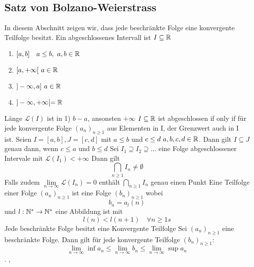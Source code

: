 \subsection{Satz von Bolzano-Weierstrass}
In diesem Abschnitt zeigen wir, dass jede beschränkte Folge eine konvergente Teilfolge besitzt.
\Def[2.21] Ein abgeschlossenes Intervall ist \(I \subseteq \mathbb{R}\)
\begin{enumerate}
    \item [1] \([a,b] \quad a \leq b,\  a,b \in \mathbb{R}\)
    \item [2] \([a,+\infty[$ $a \in \R\)
    \item [3] \(]-\infty,a]$ $a \in \R\)
    \item [4] \(]-\infty,+\infty[ = \mathbb{R}\)
\end{enumerate}
Länge \(\mathcal{L}(I)\) ist in 1) $b-a$, ansonsten $+\infty$ \newline
\Bem[2.22] $I \subseteq \mathbb{R}$ ist abgeschlossen if only if für jede konvergente Folge \((a_n)_{n \geq 1}\) aus Elementen in I, der Grenzwert auch in I ist. \newline
\Bem[2.23] Seien \( I = [a,b], J = [c,d]\) mit \(a \leq b \) und \(c \leq d \ a,b,c,d \in \mathbb{R}\). Dann gilt \( I \subseteq J \) genau dann, wenn \(c \leq a \) und \(b \leq d\) \newline \newline \newline
{} Sei \(I_1 \supseteq I_2 \supseteq \dots\) eine Folge abgeschlossener Intervale mit \(\mathcal{L}(I_1) < +\infty\)
Dann gilt \[ {\bigcap}_{n\geq1} I_{n} \neq \emptyset \] Falls zudem \(\lim\limits_{n \rightarrow \infty} \mathcal{L}(I_n) = 0\) enthält \({\bigcap}_{n\geq1} I_{n}\) genau einen Punkt \newline
\Def[2.27] Eine Teilfolge einer Folge \((a_n)_{n \geq 1}\) ist eine Folge \((b_n)_{n \geq 1}\) wobei \[b_n = a_l(n)\] und \(l: \mathbb{N}^* \rightarrow \mathbb{N}^*\) eine Abbildung ist mit \[l(n) < l(n+1) \quad \forall n \geq 1s\] 
 Jede beschränkte Folge besitzt eine Konvergente Teilfolge \newline
\Bem[2.30] Sei \((a_n)_{n \geq 1}\) eine beschränkte Folge. Dann gilt für jede konvergente Teilfolge \((b_n)_{n \geq 1} :\) \[\lim\limits_{n \rightarrow \infty} \inf a_n \leq \lim\limits_{n \rightarrow \infty} b_n \leq \lim\limits_{n \rightarrow \infty} \sup a_n\].
\sep
